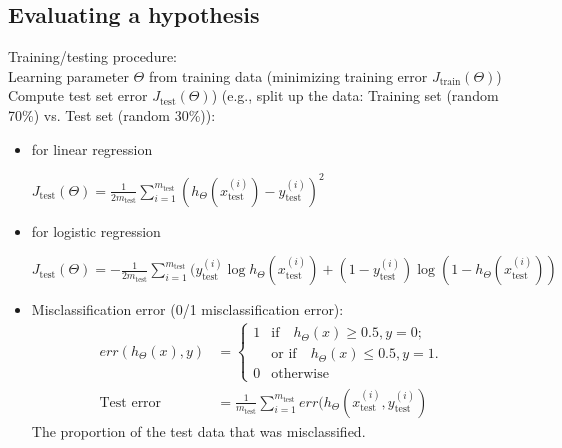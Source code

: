 \subsection{Evaluating a hypothesis}
Training/testing procedure:\\
Learning parameter $\Theta$ from training data (minimizing training error $J_{\text{train}}(\Theta)$)\\
Compute test set error $J_{\text{test}}(\Theta)$) (e.g., split up the data: Training set (random 70\%) vs. Test set (random 30\%)):
\begin{itemize}
\item
for linear regression

$J_{\text{test}}(\Theta) = \frac{1}{2m_{\text{test}}} \sum_{i=1}^{m_{\text{test}}}(h_\Theta(x_{\text{test}}^{(i)}) - y_{\text{test}}^{(i)})^{2}$
\item
for logistic regression

$J_{\text{test}}(\Theta) = -\frac{1}{2m_{\text{test}}}\sum_{i=1}^{m_{\text{test}}}(y_{\text{test}}^{(i)} \log h_\Theta(x_{\text{test}}^{(i)}) + (1-y_{\text{test}}^{(i)})\log(1-h_\Theta(x_{\text{test}}^{(i)}))$
\item
Misclassification error (0/1 misclassification error):
\begin{align}
err(h_\Theta(x), y) &= \left\{ \begin{array}{rll}
         1 & \text{if} \quad h_\Theta(x) \geq 0.5, y = 0;\\
            & \text{or if} \quad h_\Theta(x) \leq 0.5, y = 1.\\
         0 & \text{otherwise}
                \end{array}\right.\\
\text{Test error} &= \frac{1}{m_\text{{test}}}\sum_{i = 1}^{m_\text{{test}}}err(h_\Theta(x_{\text{test}}^{(i)}, y_{\text{test}}^{(i)})
\end{align}
The proportion of the test data that was misclassified.
\end{itemize}

% 
